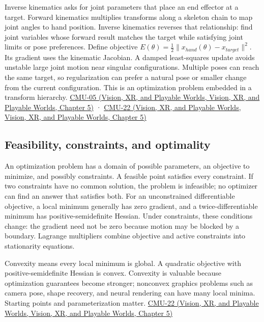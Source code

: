 Inverse kinematics asks for joint parameters that place an end effector at a target. Forward kinematics multiplies transforms along a skeleton chain to map joint angles to hand position. Inverse kinematics reverses that relationship: find joint variables whose forward result matches the target while satisfying joint limits or pose preferences. Define objective \(E(\theta)=\tfrac12\|x_{hand}(\theta)-x_{target}\|^2\). Its gradient uses the kinematic Jacobian. A damped least-squares update avoids unstable large joint motion near singular configurations. Multiple poses can reach the same target, so regularization can prefer a natural pose or smaller change from the current configuration. This is an optimization problem embedded in a transform hierarchy. \href{../07-Vision-XR-and-Playable-Worlds/main.pdf\#nameddest=04-visual-computing-ii-ch036-cmu-05---spatial-transformations}{CMU-05 (Vision, XR, and Playable Worlds, Vision, XR, and Playable Worlds, Chapter 5)} · \href{../07-Vision-XR-and-Playable-Worlds/main.pdf\#nameddest=04-visual-computing-ii-ch036-cmu-22---optimization}{CMU-22 (Vision, XR, and Playable Worlds, Vision, XR, and Playable Worlds, Chapter 5)}

\subsection{Feasibility, constraints, and optimality}\label{04-visual-computing-ii-ch029-feasibility-constraints-and-optimality}

An optimization problem has a domain of possible parameters, an objective to minimize, and possibly constraints. A feasible point satisfies every constraint. If two constraints have no common solution, the problem is infeasible; no optimizer can find an answer that satisfies both. For an unconstrained differentiable objective, a local minimum generally has zero gradient, and a twice-differentiable minimum has positive-semidefinite Hessian. Under constraints, these conditions change: the gradient need not be zero because motion may be blocked by a boundary. Lagrange multipliers combine objective and active constraints into stationarity equations.

Convexity means every local minimum is global. A quadratic objective with positive-semidefinite Hessian is convex. Convexity is valuable because optimization guarantees become stronger; nonconvex graphics problems such as camera pose, shape recovery, and neural rendering can have many local minima. Starting points and parameterization matter. \href{../07-Vision-XR-and-Playable-Worlds/main.pdf\#nameddest=04-visual-computing-ii-ch036-cmu-22---optimization}{CMU-22 (Vision, XR, and Playable Worlds, Vision, XR, and Playable Worlds, Chapter 5)}


